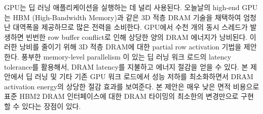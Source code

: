 \documentclass[oneside,ms]{snuthesis_utf8}
\newcommand\mycite[1]{[\citenum{#1}]}
\newcommand\myauthor[1]{\citeauthor{#1} (\citeyear{#1})}
\begin{document}





\begin{bibpage}
	
	
\end{bibpage}


\appendix
%
%

\begin{abstractalt}
GPU는 딥 러닝 애플리케이션을 실행하는 데 널리 사용된다.
오늘날의 high-end GPU는 HBM (High-Bandwidth Memory)과 같은 3D 적층 DRAM 기술을 채택하여 
엄청난 대역폭을 제공하므로 많은 전력을 소비한다.
GPU에서 수천 개의 동시 스레드가 발생하면 빈번한 row buffer conflict로 인해 상당한 양의 DRAM 에너지가 낭비된다.
이러한 낭비를 줄이기 위해 3D 적층 DRAM에 대한 partial row activation 기법을 제안한다.
풍부한 memory-level parallelism 이 있는 딥 러닝 워크 로드의 latency tolerance를 활용해서, DRAM latency를 지불하고 에너지 절감을 얻을 수 있다.
본 제안에서 딥 러닝 및 기타 기존 GPU 워크 로드에서 성능 저하를 최소화하면서 DRAM activation energy의 상당한 절감 효과를 보여준다.
본 제안은 매우 낮은 면적 비용으로 표준 HBM2 DRAM 인터페이스에 대한 DRAM 타이밍의 최소한의 변경만으로 구현할 수 있다는 장점이 있다.
\end{abstractalt}

\acknowledgement

\end{document}
